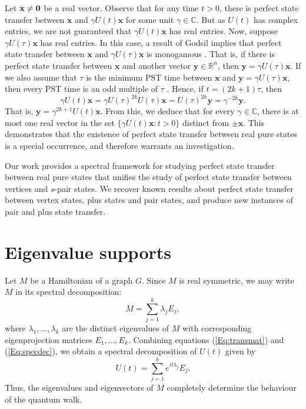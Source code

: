 \documentclass[11pt]{article}
\newcommand{\zero}{{\bf{0}}}
\newcommand{\bx}{\mathbf x}
\newcommand{\by}{\mathbf y}
\def\C{\mathbb{C}}
\def\R{\mathbb{R}}
\begin{document}
Let $\bx\neq \zero$ be a real vector. Observe that for any time $t>0$, there is perfect state transfer between $\bx$ and $\gamma U(t)\bx$ for some unit $\gamma\in \C$.
But as $U(t)$ has complex entries, we are not guaranteed that $\gamma U(t)\bx$ has real entries. Now, suppose $\gamma U(\tau)\bx$ has real entries. In this case, a result of Godsil implies that perfect state transfer between $\bx$ and $\gamma U(\tau)\bx$ is monogamous \cite[Corollary 5.3]{godsil2017real}. That is, if there is perfect state transfer between $\bx$ and another vector $\by \in \R^n$, then $\by=\gamma U(\tau)\bx$. If we also assume that $\tau$ is the minimum PST time between $\bx$ and $\by=\gamma U(\tau)\bx$, then every PST time is an odd multiple of $\tau$ \cite[Lemma 5.2]{godsil2017real}. Hence, if $t=(2k+1)\tau$, then $$\gamma U(t)\bx=\gamma U(\tau)^{2k}U(\tau)\bx= U(\tau)^{2k}\by=\gamma^{-2k}\by.$$ That is, $\by=\gamma^{2k+1} U(t)\bx$. From this, we deduce that for every $\gamma\in\C$, there is at most one real vector in the set $\{\gamma U(t)\bx:t>0\}$ distinct from $\pm\bx$. This demonstrates that the existence of perfect state transfer between real pure states is a special occurrence, and therefore warrants an investigation.

Our work provides a spectral framework for studying perfect state transfer between real pure states that unifies the study of perfect state transfer between vertices and $s$-pair states. We recover known results about perfect state transfer between vertex states, plus states and pair states, and produce new instances of pair and plus state transfer.

\section{Eigenvalue supports}
\label{Sec:esupp}

Let $M$ be a Hamiltonian of a graph $G$. Since $M$ is real symmetric, we may write $M$ in its spectral decomposition:
\begin{equation}
\label{Eq:specdec}
    M=\sum_{j=1}^k\lambda_jE_j,
\end{equation} 
where $\lambda_1, \ldots, \lambda_k$ are the distinct eigenvalues of $M$ with corresponding eigenprojection matrices $E_1, \ldots, E_k$. Combining equations (\ref{Eq:transmat}) and (\ref{Eq:specdec}), we obtain a spectral decomposition of $U(t)$ given by
\begin{equation}
\label{Ut}
U(t)=\sum_{j=1}^ke^{it\lambda_j}E_j.
\end{equation}
Thus, the eigenvalues and eigenvectors of $M$ completely determine the behaviour of the quantum walk.
\end{document}
